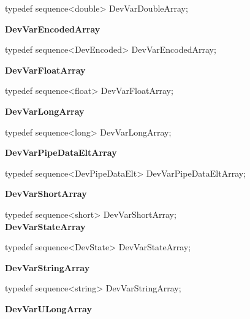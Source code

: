 typedef sequence<double> DevVarDoubleArray;\\


\begin{flushleft}
\textbf{DevVarEncodedArray}
\par\end{flushleft}

typedef sequence<DevEncoded> DevVarEncodedArray;\\


\begin{flushleft}
\textbf{DevVarFloatArray}
\par\end{flushleft}

typedef sequence<float> DevVarFloatArray;\\


\begin{flushleft}
\textbf{DevVarLongArray}
\par\end{flushleft}

typedef sequence<long> DevVarLongArray;\\


\begin{flushleft}
\textbf{DevVarPipeDataEltArray}
\par\end{flushleft}

typedef sequence<DevPipeDataElt> DevVarPipeDataEltArray;\\


\begin{flushleft}
\textbf{DevVarShortArray}
\par\end{flushleft}

typedef sequence<short> DevVarShortArray;\\


\textbf{DevVarStateArray}

typedef sequence<DevState> DevVarStateArray;\\


\begin{flushleft}
\textbf{DevVarStringArray}
\par\end{flushleft}

typedef sequence<string> DevVarStringArray;\\


\begin{flushleft}
\textbf{DevVarULongArray}
\par\end{flushleft}

